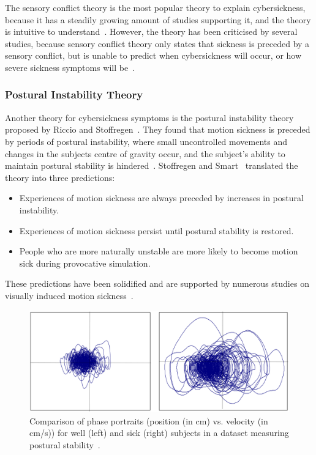 The sensory conflict theory is the most popular theory to explain cybersickness, because it has a steadily growing
amount of studies supporting it, and the theory is intuitive to understand~\cite{Rebenitsch2016,Tiiro2018}.
However, the theory has been criticised by several studies, because sensory conflict theory only states that sickness
is preceded by a sensory conflict, but is unable to predict when cybersickness will occur, or how severe
sickness symptoms will be~\cite{LaViola2000,Rebenitsch2016,Kolasinski1995}.


\subsubsection{Postural Instability Theory}\label{subsubsec:postural-instability-theory}

Another theory for cybersickness symptoms is the postural instability theory proposed by Riccio and Stoffregen~\cite{Riccio1991}.
They found that motion sickness is preceded by periods of postural instability, where small uncontrolled movements and
changes in the subjects centre of gravity occur, and the subject's ability to maintain postural stability is
hindered~\cite{Riccio1991,Clifton2020}.
Stoffregen and Smart~\cite{Stoffregen1998} translated the theory into three predictions:
\begin{itemize}
    \item Experiences of motion sickness are always preceded by increases in postural instability.
    \item Experiences of motion sickness persist until postural stability is restored.
    \item People who are more naturally unstable are more likely to become motion sick during provocative simulation.
\end{itemize}
These predictions have been solidified and are supported by numerous studies on visually induced motion
sickness~\cite{Clifton2020}.

\begin{figure}[h]
    \centering
    \includegraphics[width=\textwidth]{content/2_2_cybersickness/img/PosturalStability[Smart2013]}
    \caption{Comparison of phase portraits (position (in cm) vs. velocity (in cm/s)) for well (left) and sick (right)
        subjects in a dataset measuring postural stability~\cite{Smart2013}.}
    \label{fig:postural-instability-sample}
\end{figure}

